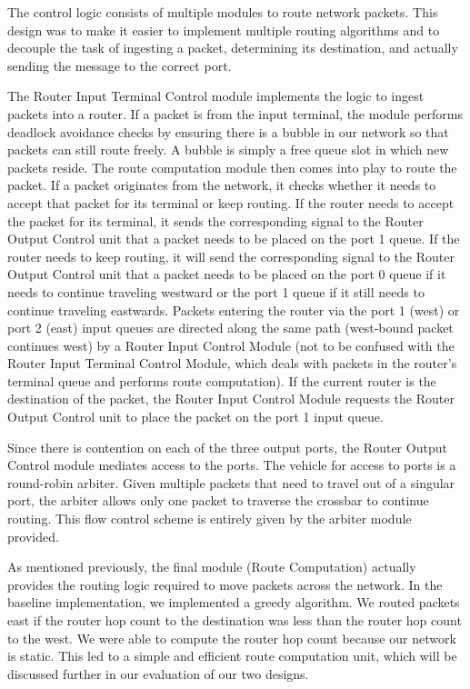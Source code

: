 \documentclass[10pt]{article}
\begin{document}
The control logic consists of multiple modules to route network packets.
This design was to make it easier to implement multiple routing algorithms
and to decouple the task of ingesting a packet, determining its destination,
and actually sending the message to the correct port. \par
The Router Input Terminal Control module implements the logic to ingest packets into
a router. 
If a packet is from the input terminal, the module performs deadlock avoidance 
checks by ensuring there is a bubble in our network so that packets can still
route freely.
A bubble is simply a free queue slot in which new packets reside.
The route computation module then comes into play to route the packet.
If a packet originates from the network, it checks whether it needs to accept
that packet for its terminal or keep routing. 
If the router needs to accept the packet for its terminal, it sends the
corresponding signal to the Router Output Control unit that a packet needs to 
be placed on the port 1 queue. 
If the router needs to keep routing, it will send the corresponding signal to
the Router Output Control unit that a packet needs to be placed on the port 0
queue if it needs to continue traveling westward or the port 1 queue if it 
still needs to continue traveling eastwards.
Packets entering the router via the port 1 (west) or port 2 (east) input queues
are directed along the same path (west-bound packet continues west) by a Router
Input Control Module (not to be confused with the Router Input Terminal Control 
Module, which deals with packets in the router's terminal queue and performs route 
computation). If the current router is the destination of the packet, the Router
Input Control Module requests the Router Output Control unit to place the packet on
the port 1 input queue.  \par

Since there is contention on each of the three output ports, the 
Router Output Control module mediates access to the ports. 
The vehicle for access to ports is a round-robin arbiter. 
Given multiple packets that need to travel out of a singular port, the arbiter
allows only one packet to traverse the crossbar to continue routing. 
This flow control scheme is entirely given by the arbiter module provided. \par

As mentioned previously, the final module (Route Computation) actually provides
the routing logic required to move packets across the network.
In the baseline implementation, we implemented a greedy algorithm.
We routed packets east if the router hop count to the destination was less than
the router hop count to the west. 
We were able to compute the router hop count because our network is static. 
This led to a simple and efficient route computation unit, which will be 
discussed further in our evaluation of our two designs.
\end{document}
